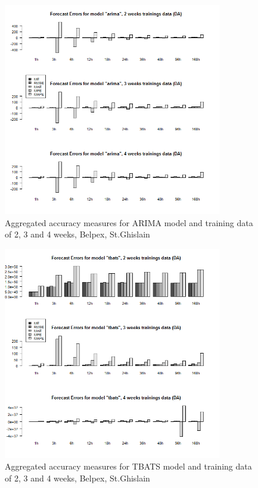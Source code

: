 \begin{figure}[!ht]
	\centering
		\includegraphics[width=0.85\textwidth]{figures/appendix_forecast_results/da_sim_2_x_1w_1w_arima.png}
	\caption{Aggregated accuracy measures for ARIMA model and training data of 2, 3 and 4 weeks, Belpex, St.Ghislain}
	\label{fig:app_da_sim_2_x_1w_1w_arima}
	\vspace*{-1.6in}
\end{figure}




\begin{figure}[!ht]
	\centering
		\includegraphics[width=0.85\textwidth]{figures/appendix_forecast_results/da_sim_2_x_1w_1w_tbats.png}
	\caption{Aggregated accuracy measures for TBATS model and training data of 2, 3 and 4 weeks, Belpex, St.Ghislain}
	\label{fig:app_da_sim_2_x_1w_1w_tbats}
\end{figure}




